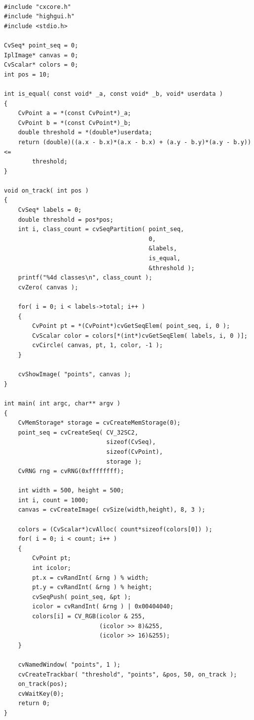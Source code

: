 \begin{lstlisting}

#include "cxcore.h"
#include "highgui.h"
#include <stdio.h>

CvSeq* point_seq = 0;
IplImage* canvas = 0;
CvScalar* colors = 0;
int pos = 10;

int is_equal( const void* _a, const void* _b, void* userdata )
{
    CvPoint a = *(const CvPoint*)_a;
    CvPoint b = *(const CvPoint*)_b;
    double threshold = *(double*)userdata;
    return (double)((a.x - b.x)*(a.x - b.x) + (a.y - b.y)*(a.y - b.y)) <=
        threshold;
}

void on_track( int pos )
{
    CvSeq* labels = 0;
    double threshold = pos*pos;
    int i, class_count = cvSeqPartition( point_seq,
                                         0,
                                         &labels,
                                         is_equal,
                                         &threshold );
    printf("%4d classes\n", class_count );
    cvZero( canvas );

    for( i = 0; i < labels->total; i++ )
    {
        CvPoint pt = *(CvPoint*)cvGetSeqElem( point_seq, i, 0 );
        CvScalar color = colors[*(int*)cvGetSeqElem( labels, i, 0 )];
        cvCircle( canvas, pt, 1, color, -1 );
    }

    cvShowImage( "points", canvas );
}

int main( int argc, char** argv )
{
    CvMemStorage* storage = cvCreateMemStorage(0);
    point_seq = cvCreateSeq( CV_32SC2,
                             sizeof(CvSeq),
                             sizeof(CvPoint),
                             storage );
    CvRNG rng = cvRNG(0xffffffff);

    int width = 500, height = 500;
    int i, count = 1000;
    canvas = cvCreateImage( cvSize(width,height), 8, 3 );

    colors = (CvScalar*)cvAlloc( count*sizeof(colors[0]) );
    for( i = 0; i < count; i++ )
    {
        CvPoint pt;
        int icolor;
        pt.x = cvRandInt( &rng ) % width;
        pt.y = cvRandInt( &rng ) % height;
        cvSeqPush( point_seq, &pt );
        icolor = cvRandInt( &rng ) | 0x00404040;
        colors[i] = CV_RGB(icolor & 255,
                           (icolor >> 8)&255,
                           (icolor >> 16)&255);
    }

    cvNamedWindow( "points", 1 );
    cvCreateTrackbar( "threshold", "points", &pos, 50, on_track );
    on_track(pos);
    cvWaitKey(0);
    return 0;
}
\end{lstlisting}

